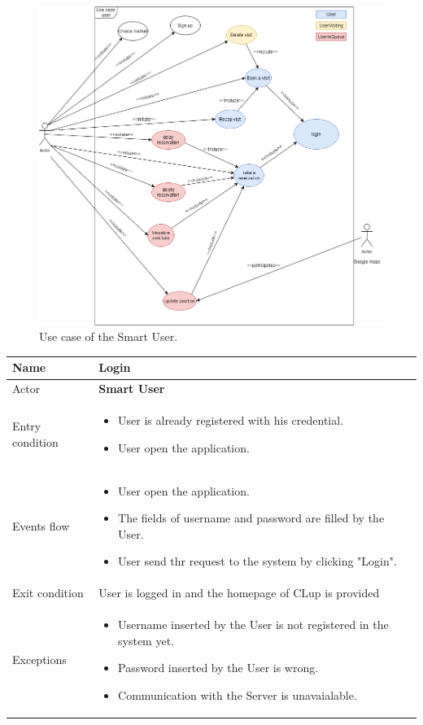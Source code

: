 \begin{figure}[H]
	\caption{Use case of the Smart User.}
	\label{fig:UML2}
	
	\centering
	\includegraphics[scale=0.5]{diagrams/UseCaseUser.png}
	
\end{figure}



\begin{tabular}{|p{5cm} | p{7cm} | }
\hline
Name & \textbf{Login} \\
\hline
Actor & \textbf{Smart User} \\
\hline
Entry condition &
\begin{itemize}
\item User is already registered with his credential. 
\item User open the application.
\end{itemize} \\
\hline
Events flow & 
\begin{itemize}
	\item User open the application.
	\item The fields of username and password are filled by the User. 
	\item User send thr request to the system by clicking "Login".
\end{itemize} \\
\hline
Exit condition & User is logged in and the homepage of CLup is provided \\
\hline 
Exceptions &
\begin{itemize}
	\item Username inserted by the User is not registered in the system yet.
	\item Password inserted by the User is wrong.
    \item Communication with the Server is unavaialable.
\end{itemize} \\
\hline
\end{tabular}

